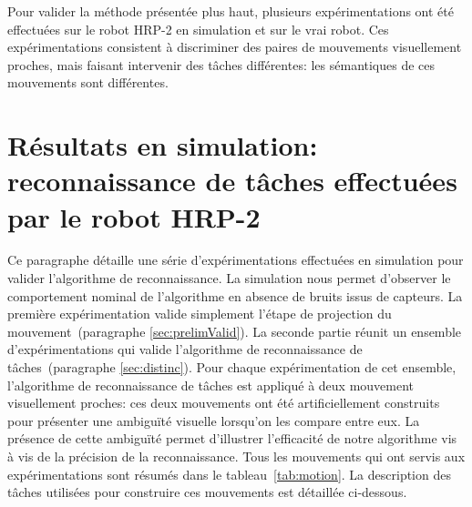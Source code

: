 \label{chap:xpRobot}

Pour valider la m\'ethode présentée plus haut, plusieurs exp\'erimentations
ont \'et\'e effectu\'ees sur le robot HRP-2 en simulation
et sur le vrai robot. Ces exp\'erimentations consistent 
\`a discriminer des paires de mouvements visuellement proches, mais 
faisant intervenir des t\^aches diff\'erentes: les s\'emantiques
de ces mouvements sont diff\'erentes.

\section{Résultats en simulation: reconnaissance de t\^aches effectuées par le robot HRP-2}
\label{sec:simu}
Ce paragraphe détaille une série d'expérimentations effectuées en simulation pour 
valider l'algorithme de reconnaissance.
La simulation nous permet d'observer le comportement nominal de l'algorithme
en absence de bruits issus de capteurs.
La première expérimentation valide simplement l'étape de projection 
du mouvement~(paragraphe \ref{sec:prelimValid}). 
La seconde partie réunit un ensemble d'expérimentations qui valide l'algorithme de reconnaissance 
de t\^aches~(paragraphe \ref{sec:distinc}).
Pour chaque expérimentation de cet ensemble, l'algorithme de reconnaissance de t\^aches
est appliqué à deux mouvement visuellement proches:
ces deux mouvements ont été artificiellement construits pour présenter une
ambigu\"ité visuelle lorsqu'on les compare entre eux. La présence de cette
ambiguïté permet d'illustrer l'efficacité de notre algorithme
vis à vis de la précision de la reconnaissance.
Tous les mouvements qui ont servis aux expérimentations sont résumés dans le tableau~\ref{tab:motion}.
La description des t\^aches utilisées pour construire ces mouvements est détaillée ci-dessous.

